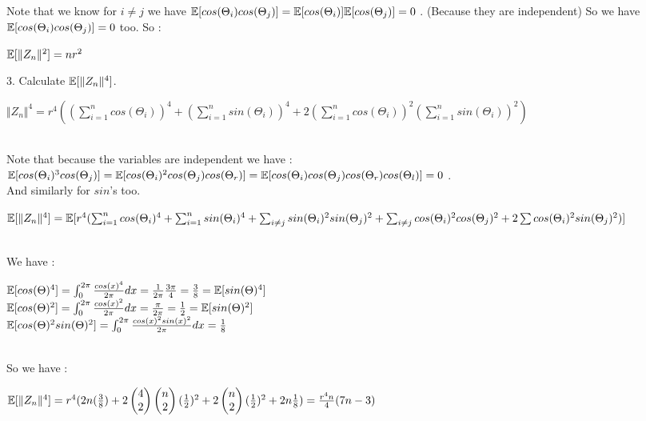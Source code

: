\documentclass[30pt]{article}
\begin{document}
Note that we know for $i\neq j$ we have  $ \Bbb{E}[cos(\Theta_i)cos(\Theta_j)] = \Bbb{E}[cos(\Theta_i)] \Bbb{E}[cos(\Theta_j)] = 0 $ . (Because they are independent) So we have $\Bbb{E}[cos(\Theta_i)cos(\Theta_j)] = 0 $ too. So : 
\begin{center}
    $\Bbb{E}[\Vert Z_n\Vert^2] = nr^2 $
\end{center}
{\color{blue} {\large 3.} Calculate $\Bbb{E}[\Vert Z_n\Vert^4] $. } \\ \newline
\begin{center}
    $\Vert Z_n \Vert^4 = r^4((\sum_{i=1}^{n}cos(\Theta_i) )^4 +(\sum_{i=1}^{n}sin(\Theta_i) )^4 + 2(\sum_{i=1}^{n}cos(\Theta_i) )^2(\sum_{i=1}^{n}sin(\Theta_i) )^2)  $
\end{center} \vspace{0.2cm} \\
Note that because the variables are independent we have : \\ $\Bbb{E}[cos(\Theta_i)^3cos(\Theta_j)] = \Bbb{E}[cos(\Theta_i)^2cos(\Theta_j)cos(\Theta_r)] = \Bbb{E}[cos(\Theta_i)cos(\Theta_j)cos(\Theta_r) cos(\Theta_l)] = 0 $ . \\ And similarly for $sin$'s too. \\ 
\begin{center}
    $\Bbb{E}[\Vert Z_n \Vert^4] = \Bbb{E} [r^4(\sum_{i=1}^{n}cos(\Theta_i)^4 + \sum_{i=1}^{n}sin(\Theta_i)^4 + \sum_{i\neq j}sin(\Theta_i)^2sin(\Theta_j)^2 + \sum_{i\neq j}cos(\Theta_i)^2 cos(\Theta_j)^2 +2\sum cos(\Theta_i)^2 sin(\Theta_j)^2  )] $
\end{center} \\
We have : \\ 
\begin{center}
    $\Bbb{E}[cos(\Theta)^4] = \int_{0}^{2\pi}\frac{cos(x)^4}{2\pi}dx = \frac{1}{2\pi}\frac{3\pi}{4}= \frac{3}{8} = \Bbb{E}[sin(\Theta)^4]  $ \vspace{0.3cm}\\ 
    $\Bbb{E}[cos(\Theta)^2] = \int_{0}^{2\pi}\frac{cos(x)^2}{2\pi}dx = \frac{\pi}{2\pi} = \frac{1}{2} = \Bbb{E}[sin(\Theta)^2] $ \vspace{0.3cm} \\
    $\Bbb{E}[cos(\Theta)^2 sin(\Theta)^2] = \int_{0}^{2\pi}\frac{cos(x)^2 sin(x)^2}{2\pi}dx = \frac{1}{8} $
\end{center} \\
So we have : \\ 
\begin{center}
    $\Bbb{E}[\Vert Z_n \Vert^4] = r^4 (2n(\frac{3}{8}) + 2\begin{pmatrix}
        4 \\ 2
    \end{pmatrix} \begin{pmatrix}
        n \\ 2
    \end{pmatrix} (\frac{1}{2})^2 + 2 \begin{pmatrix}
        n \\ 2
    \end{pmatrix}(\frac{1}{2})^2 + 2n \frac{1}{8}) = \frac{r^4 n}{4}(7n - 3) $
\end{center}
\end{document}
